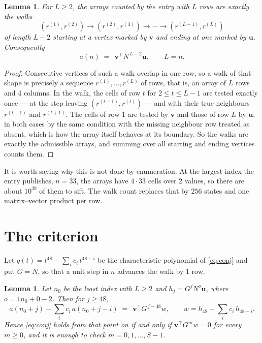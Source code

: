 \documentclass[11pt,a4paper]{article}
\theoremstyle{plain}
\newtheorem{lemma}[theorem]{Lemma}
\theoremstyle{definition}
\begin{document}
\begin{lemma}\label{lem:walk}
For $L\ge2$, the arrays counted by the entry with $L$ rows are exactly the walks
\[
(r^{(1)},r^{(2)})\to(r^{(2)},r^{(3)})\to\cdots\to(r^{(L-1)},r^{(L)})
\]
of length $L-2$ starting at a vertex marked by $\mathbf{v}$ and ending at one marked by
$\mathbf{u}$. Consequently
\[
a(n)\;=\;\,\mathbf{v}^{\!\top}N^{\,L-2}\mathbf{u},\qquad L=n .
\]
\end{lemma}

\begin{proof}
Consecutive vertices of such a walk overlap in one row, so a walk of that shape is
precisely a sequence $r^{(1)},\dots,r^{(L)}$ of rows, that is, an array of $L$ rows
and $4$ columns. In the walk, the cells of row $t$ for $2\le t\le L-1$ are tested
exactly once --- at the step leaving $(r^{(t-1)},r^{(t)})$ --- and with their true
neighbours $r^{(t-1)}$ and $r^{(t+1)}$. The cells of row $1$ are tested by
$\mathbf{v}$ and those of row $L$ by $\mathbf{u}$, in both cases by the same condition
with the missing neighbour row treated as absent, which is how the array itself behaves at
its boundary. So the walks are exactly the admissible arrays, and summing over all starting
and ending vertices counts them.
\end{proof}


It is worth saying why this is not done by enumeration. At the largest index the entry
publishes, $n=33$, the arrays have $4\cdot33$ cells over
$2$ values, so there are about $10^{39}$ of them to sift. The
walk count replaces that by $256$ states and one matrix--vector product per row.
\section{The criterion}

Let $q(t)=t^{48}-\sum_i c_i\,t^{48-i}$ be the characteristic polynomial of
\eqref{eq:conj} and put $G=N$, so that a unit step in $n$ advances the walk by
$1$ row.

\begin{lemma}\label{lem:crit}
Let $n_0$ be the least index with $L\ge2$ and $h_j=G^{j}N^{o}\mathbf{u}$, where
$o=1n_0+0-2$. Then for $j\ge48$,
\[
a(n_0+j)-\sum_i c_i\,a(n_0+j-i)\;=\;\,\mathbf{v}^{\!\top}G^{\,j-48}w,
\qquad w=h_{48}-\sum_i c_i\,h_{48-i} .
\]
Hence \eqref{eq:conj} holds from that point on if and only if
$\mathbf{v}^{\!\top}G^{m}w=0$ for every $m\ge0$, and it is enough to check
$m=0,1,\dots,S-1$.
\end{lemma}
\end{document}
